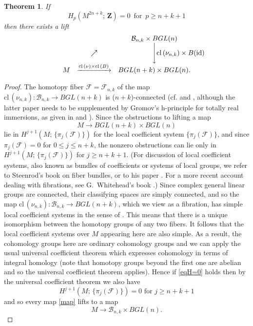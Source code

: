 \documentclass{amsart}
\newtheorem{theorem}{Theorem}[section]
\begin{document}
\begin{theorem}\label{lifttheorem}
If
\begin{equation}
H_{p}(M^{2n+k};\, \mathbf Z)=0 \,\text{ for }\, p\geq n+k+1\label{eqH=0}
\end{equation}
then  there exists a lift
\[
\begin{array}{ccc}
& &{{\mathcal B}}_{n,k} \times BGL(n)\\
&
\nearrow&\Bigg\downarrow\rlap{$\mathrm{cl}\,(\nu_{n,k}) \times  B(\mathrm{id)}$}\\
M&\xrightarrow{\scriptstyle{\mathrm{cl}\,(\nu)\times \mathrm{cl}\,(B)}}&BGL(n+k)\times BGL(n).\\
\end{array}\]
\end{theorem}

\begin{proof}
The homotopy fiber ${{\mathcal{F}}} = {{\mathcal{F}}}_{n,k}$ of the map
$\mathrm{cl}\,(\nu_{n,k}) : {{\mathcal B}}_{n,k} \to BGL(n+k)$
is ($n+k$)-connected (cf. \cite{Ad} and \cite{Land}, although the latter paper needs to be supplemented by Gromov's h-principle for totally real immersions, as given in \cite{GR} and \cite{Gr}).
Since the obstructions to lifting a map
\begin{equation}\label{map}      
M\to BGL(n+k)\times BGL(n)
\end{equation}
lie in $H^{j+1}(M;\,\{\pi _j({{\mathcal{F}}})\})$ for
the local coefficient system $\{ \pi_j({{\mathcal{F}}} )\}$, and since $\pi
_j({{\mathcal{F}}} )=0$ for $ 0\leq j\leq n+k$, 
the nonzero obstructions can
lie only in $H^{j+1}(M;\,\{ \pi _j({{\mathcal{F}}})\})$ for $j\geq n+k+1$.
(For discussion of local coefficient systems, also known as bundles of coefficients or systems of local groups, we refer to Steenrod's book \cite{St51} on fiber bundles, or to his paper \cite{St43}.  For a more recent account dealing with fibrations, see G.~Whitehead's book \cite[Chapter VI]{Whitehead}.) 
Since  complex general linear groups are connected, their classifying spaces are simply connected, 
and so the map 
$\mathrm{cl}\,(\nu_{n,k}) : {{\mathcal B}}_{n,k} \to BGL(n+k)$, which we
view as a fibration, has simple local coefficient systems in the sense 
of \cite{St43}.  This means that there is a unique isomorphism between
the homotopy groups of any two fibers.  
It follows that the local coefficient systems over $M$ appearing here are also simple.
As a result, the cohomology groups here are ordinary cohomology groups
and we can apply the usual universal coefficient theorem which
expresses cohomology in terms of integral homology (note that 
homotopy  groups beyond the first one are abelian and so the universal
coefficient theorem applies).
Hence if \eqref{eqH=0} holds then by the universal coefficient theorem
we also have
\[
 H^{j+1}(M;\, \{\pi _j({{\mathcal{F}}})\}) = 0 \text{ for } j\geq n+k+1
\]
and so every map \eqref{map} lifts to a map 
\[
M\to {{\mathcal B}}_{n,k} \times BGL(n).
\]
\end{proof}
\end{document}
